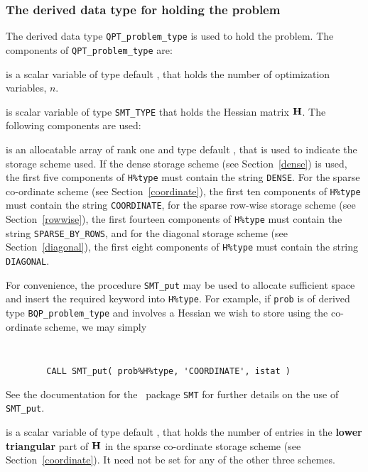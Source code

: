\documentclass{galahad}
\newcommand{\packagename}{BQP}
\begin{document}

\subsubsection{The derived data type for holding the problem}\label{typeprob}
The derived data type {\tt QPT\_problem\_type} is used to hold 
the problem. The components of 
{\tt QPT\_problem\_type} 
are:

\begin{description}

 is a scalar variable of type default \integer, 
 that holds the number of optimization variables, $n$.  
              
 is scalar variable of type {\tt SMT\_TYPE} 
that holds the Hessian matrix ${\mathbf{H}}$. The following components
are used:

\begin{description}

 is an allocatable array of rank one and type default \character, that
is used to indicate the storage scheme used. If the dense storage scheme 
(see Section~\ref{dense}) is used, 
the first five components of {\tt H\%type} must contain the
string {\tt DENSE}.
For the sparse co-ordinate scheme (see Section~\ref{coordinate}), 
the first ten components of {\tt H\%type} must contain the
string {\tt COORDINATE},  
for the sparse row-wise storage scheme (see Section~\ref{rowwise}),
the first fourteen components of {\tt H\%type} must contain the
string {\tt SPARSE\_BY\_ROWS},
and for the diagonal storage scheme (see Section~\ref{diagonal}),
the first eight components of {\tt H\%type} must contain the
string {\tt DIAGONAL}.

For convenience, the procedure {\tt SMT\_put} 
may be used to allocate sufficient space and insert the required keyword
into {\tt H\%type}.
For example, if {\tt prob} is of derived type {\tt \packagename\_problem\_type}
and involves a Hessian we wish to store using the co-ordinate scheme,
we may simply
{\tt 
\begin{verbatim}
        CALL SMT_put( prob%H%type, 'COORDINATE', istat )
\end{verbatim}
}
\noindent
See the documentation for the \galahad\ package {\tt SMT} 
for further details on the use of {\tt SMT\_put}.

 is a scalar variable of type default \integer, that 
holds the number of entries in the {\bf lower triangular} part of ${\mathbf{H}}$
in the sparse co-ordinate storage scheme (see Section~\ref{coordinate}). 
It need not be set for any of the other three schemes.


\end{description}
\end{description}
\end{document}
